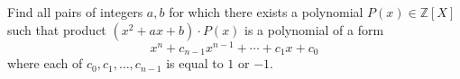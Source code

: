 Find all pairs of integers $a,b$ for which there exists a polynomial $P(x) \in \mathbb{Z}[X]$ such that product $(x^2+ax+b)\cdot P(x)$ is a polynomial of a form \[ x^n+c_{n-1}x^{n-1}+\cdots+c_1x+c_0  \] where each of $c_0,c_1,\ldots,c_{n-1}$ is equal to $1$ or $-1$.
